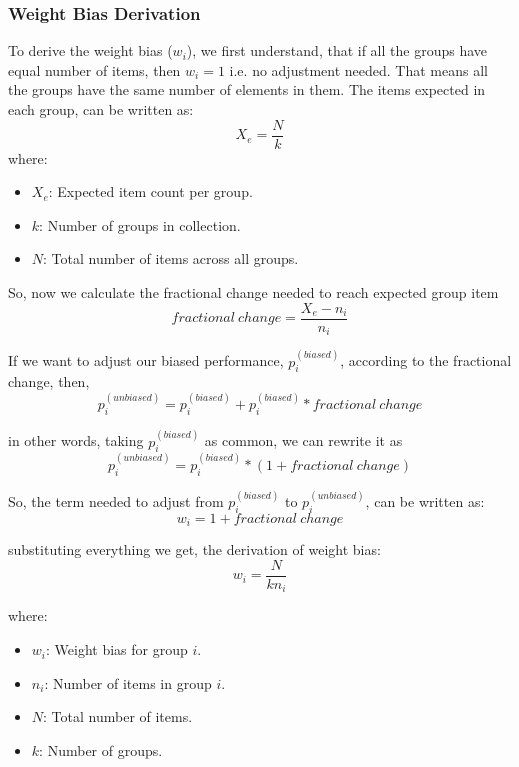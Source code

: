 \documentclass[man,floatsintext]{apa7}
\begin{document}
\subsubsection*{Weight Bias Derivation}
To derive the weight bias ($w_i$), we first understand, that if all the groups have equal number of items, then $w_i = 1$ i.e. no adjustment needed. That means all the groups have the same number of elements in them. The items expected in each group, can be written as:
\begin{equation}
X_e = \frac{N}{k}
\end{equation}
where:
\begin{itemize}
    \item $X_e$: Expected item count per group.
    \item $k$: Number of groups in collection.
    \item $N$: Total number of items across all groups.
\end{itemize}

So, now we calculate the fractional change needed to reach expected group item
\begin{equation}
 fractional \ change = \frac{X_e - n_i}{n_i}
\end{equation}

If we want to adjust our biased performance, $p_i^{(biased)}$, according to the fractional change, 
then,
\begin{equation}
    p_i^{(unbiased)} = p_i^{(biased)} +  p_i^{(biased)} *  fractional \ change
\end{equation}

in other words, taking $p_i^{(biased)}$ as common, we can rewrite it as
\begin{equation}
\label{eq:p-unbiased}
    p_i^{(unbiased)} = p_i^{(biased)} * (1 +  fractional \ change)
\end{equation}

So, the term needed to adjust from $p_i^{(biased)}$ to $p_i^{(unbiased)}$, can be written as:
\begin{equation}
    w_i = 1 + fractional \ change
\end{equation}

substituting everything we get, the derivation of weight bias:
\begin{equation}\label{eq:weight-bias}
    w_i = \frac{N}{kn_i}
\end{equation}

where:
\begin{itemize}
    \item $w_i$: Weight bias for group $i$.
    \item $n_i$: Number of items in group $i$.
    \item $N$: Total number of items.
    \item $k$: Number of groups.
\end{itemize}
\end{document}
